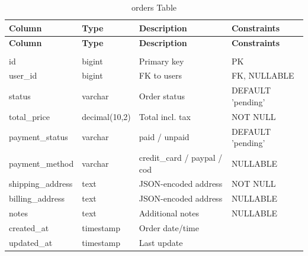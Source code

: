 \renewcommand{\arraystretch}{1.3}
\begin{longtable}{|p{3cm}|p{3cm}|p{4cm}|p{3cm}|}
    \hline
    \textbf{Column} & \textbf{Type} & \textbf{Description} & \textbf{Constraints} \\
    \hline
    \endfirsthead
    \hline
    \textbf{Column} & \textbf{Type} & \textbf{Description} & \textbf{Constraints} \\
    \hline
    \endhead
    \hline
    \endfoot
    \hline
    \caption{orders Table} \label{tab:orders} \\
    \endlastfoot
    id & bigint & Primary key & PK \\
    \hline
    user\_id & bigint & FK to users & FK, NULLABLE \\
    \hline
    status & varchar & Order status & DEFAULT 'pending' \\
    \hline
    total\_price & decimal(10,2) & Total incl. tax & NOT NULL \\
    \hline
    payment\_status & varchar & paid / unpaid & DEFAULT 'pending' \\
    \hline
    payment\_method & varchar & credit\_card / paypal / cod & NULLABLE \\
    \hline
    shipping\_address & text & JSON-encoded address & NOT NULL \\
    \hline
    billing\_address & text & JSON-encoded address & NULLABLE \\
    \hline
    notes & text & Additional notes & NULLABLE \\
    \hline
    created\_at & timestamp & Order date/time & \\
    \hline
    updated\_at & timestamp & Last update & \\
    \hline
\end{longtable}


